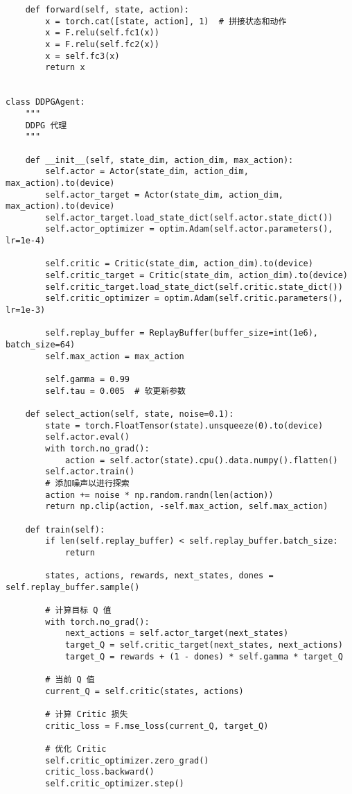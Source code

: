 \begin{lstlisting}
    def forward(self, state, action):
        x = torch.cat([state, action], 1)  # 拼接状态和动作
        x = F.relu(self.fc1(x))
        x = F.relu(self.fc2(x))
        x = self.fc3(x)
        return x


class DDPGAgent:
    """
    DDPG 代理
    """

    def __init__(self, state_dim, action_dim, max_action):
        self.actor = Actor(state_dim, action_dim, max_action).to(device)
        self.actor_target = Actor(state_dim, action_dim, max_action).to(device)
        self.actor_target.load_state_dict(self.actor.state_dict())
        self.actor_optimizer = optim.Adam(self.actor.parameters(), lr=1e-4)

        self.critic = Critic(state_dim, action_dim).to(device)
        self.critic_target = Critic(state_dim, action_dim).to(device)
        self.critic_target.load_state_dict(self.critic.state_dict())
        self.critic_optimizer = optim.Adam(self.critic.parameters(), lr=1e-3)

        self.replay_buffer = ReplayBuffer(buffer_size=int(1e6), batch_size=64)
        self.max_action = max_action

        self.gamma = 0.99
        self.tau = 0.005  # 软更新参数

    def select_action(self, state, noise=0.1):
        state = torch.FloatTensor(state).unsqueeze(0).to(device)
        self.actor.eval()
        with torch.no_grad():
            action = self.actor(state).cpu().data.numpy().flatten()
        self.actor.train()
        # 添加噪声以进行探索
        action += noise * np.random.randn(len(action))
        return np.clip(action, -self.max_action, self.max_action)

    def train(self):
        if len(self.replay_buffer) < self.replay_buffer.batch_size:
            return

        states, actions, rewards, next_states, dones = self.replay_buffer.sample()

        # 计算目标 Q 值
        with torch.no_grad():
            next_actions = self.actor_target(next_states)
            target_Q = self.critic_target(next_states, next_actions)
            target_Q = rewards + (1 - dones) * self.gamma * target_Q

        # 当前 Q 值
        current_Q = self.critic(states, actions)

        # 计算 Critic 损失
        critic_loss = F.mse_loss(current_Q, target_Q)

        # 优化 Critic
        self.critic_optimizer.zero_grad()
        critic_loss.backward()
        self.critic_optimizer.step()


\end{lstlisting}

